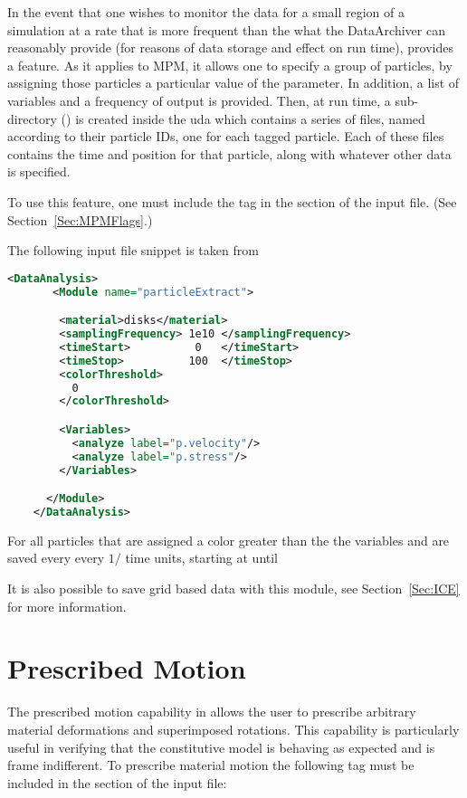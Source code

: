 In the event that one wishes to monitor the data for a small region of a
simulation at a rate that is more frequent than the what the DataArchiver
can reasonably provide (for reasons of data storage and effect on run time),
\Vaango provides a  feature.  As it applies
to MPM, it allows one to specify a group of particles, by assigning those
particles a particular value of the  parameter.
In addition, a list of variables and a frequency of output is provided.
Then, at run time, a sub-directory ()
is created inside the uda which contains
a series of files, named according to their particle IDs, one for each
tagged particle.  Each of these files contains the time and position for
that particle, along with whatever other data is specified.  
\begin{NoteBox}
To use this
feature, one must include the 
tag in the  section of the input file.
(See Section~\ref{Sec:MPMFlags}.)
\end{NoteBox}

The following input file snippet is taken from
\begin{lstlisting}[language=XML]
    <DataAnalysis>
       <Module name="particleExtract">

        <material>disks</material>
        <samplingFrequency> 1e10 </samplingFrequency>
        <timeStart>          0   </timeStart>
        <timeStop>          100  </timeStop>
        <colorThreshold>
          0
        </colorThreshold>

        <Variables>
          <analyze label="p.velocity"/>
          <analyze label="p.stress"/>
        </Variables>

      </Module>
    </DataAnalysis>
\end{lstlisting}

For all particles that are assigned a color greater than the
 the variables
 and
 are saved every every
$1/$ time units, starting at
 until

It is also possible to save grid based data with this module,
see Section~\ref{Sec:ICE} for more information.

\section{Prescribed Motion} \label{Sec:PrescribedMotion} The prescribed motion
capability in \Vaango allows the user to prescribe arbitrary material
deformations and superimposed rotations.  This capability is particularly
useful in verifying that the constitutive model is behaving as expected and is
frame indifferent.  To prescribe material motion the following tag must be
included in the  section of the input file:

